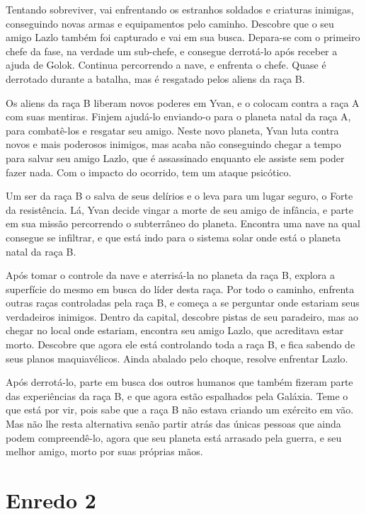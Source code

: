 \documentclass[12pt, a4paper]{article}
\begin{document}
    Tentando sobreviver, vai enfrentando os estranhos soldados e criaturas inimigas,
    conseguindo novas armas e equipamentos pelo caminho. Descobre que o seu amigo 
    Lazlo também foi capturado e vai em sua busca. Depara-se com o primeiro chefe
    da fase, na verdade um sub-chefe, e consegue derrotá-lo após receber a ajuda
    de Golok. Continua percorrendo a nave, e enfrenta o chefe. Quase é derrotado
    durante a batalha, mas é resgatado pelos aliens da raça B.

    Os aliens da raça B liberam novos poderes em Yvan, e o colocam contra a raça A
    com suas mentiras. Finjem ajudá-lo enviando-o para o planeta natal da raça A,
    para combatê-los e resgatar seu amigo. Neste novo planeta, Yvan luta contra
    novos e mais poderosos inimigos, mas acaba não conseguindo chegar a tempo para
    salvar seu amigo Lazlo, que é assassinado enquanto ele assiste sem poder fazer
    nada. Com o impacto do ocorrido, tem um ataque psicótico.

    Um ser da raça B o salva de seus delírios e o leva para um lugar seguro, o Forte
    da resistência. Lá, Yvan decide vingar a morte de seu amigo de infância, e
    parte em sua missão percorrendo o subterrâneo do planeta. Encontra uma nave na
    qual consegue se infiltrar, e que está indo para o sistema solar onde está
    o planeta natal da raça B.

    Após tomar o controle da nave e aterrisá-la no planeta da raça B, explora
    a superfície do mesmo em busca do líder desta raça. Por todo o caminho, enfrenta
    outras raças controladas pela raça B, e começa a se perguntar onde estariam seus
    verdadeiros inimigos. Dentro da capital, descobre pistas de seu paradeiro, mas
    ao chegar no local onde estariam, encontra seu amigo Lazlo, que acreditava estar
    morto. Descobre que agora ele está controlando toda a raça B, e fica sabendo de
    seus planos maquiavélicos. Ainda abalado pelo choque, resolve enfrentar Lazlo.

    Após derrotá-lo, parte em busca dos outros humanos que também fizeram parte
    das experiências da raça B, e que agora estão espalhados pela Galáxia.
    Teme o que está por vir, pois sabe que a raça B não estava criando um exército
    em vão. Mas não lhe resta alternativa senão partir atrás das únicas pessoas que ainda
    podem compreendê-lo, agora que seu planeta está arrasado pela
    guerra, e seu melhor amigo, morto por suas próprias mãos.

\section{Enredo 2}
\end{document}
